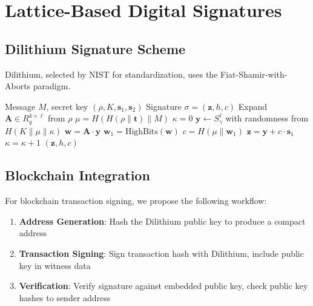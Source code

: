\documentclass[11pt,a4paper]{article}
\begin{document}
\section{Lattice-Based Digital Signatures}

\subsection{Dilithium Signature Scheme}

Dilithium, selected by NIST for standardization, uses the Fiat-Shamir-with-Aborts paradigm.

\begin{algorithm}
\caption{Dilithium Signing}
\begin{algorithmic}[1]
\Require Message $M$, secret key $(\rho, K, \mathbf{s}_1, \mathbf{s}_2)$
\Ensure Signature $\sigma = (\mathbf{z}, h, c)$
\State Expand $\mathbf{A} \in R_q^{k \times \ell}$ from $\rho$
\State $\mu = H(H(\rho \| \mathbf{t}) \| M)$
\State $\kappa = 0$
\Repeat
    \State $\mathbf{y} \leftarrow S_\gamma^{\ell}$ with randomness from $H(K \| \mu \| \kappa)$
    \State $\mathbf{w} = \mathbf{A} \cdot \mathbf{y}$
    \State $\mathbf{w}_1 = \text{HighBits}(\mathbf{w})$
    \State $c = H(\mu \| \mathbf{w}_1)$
    \State $\mathbf{z} = \mathbf{y} + c \cdot \mathbf{s}_1$
    \State $\kappa = \kappa + 1$
\State \Return $(\mathbf{z}, h, c)$
\end{algorithmic}
\end{algorithm}

\subsection{Blockchain Integration}

For blockchain transaction signing, we propose the following workflow:

\begin{enumerate}
    \item \textbf{Address Generation}: Hash the Dilithium public key to produce a compact address
    \item \textbf{Transaction Signing}: Sign transaction hash with Dilithium, include public key in witness data
    \item \textbf{Verification}: Verify signature against embedded public key, check public key hashes to sender address
\end{enumerate}
\end{document}
